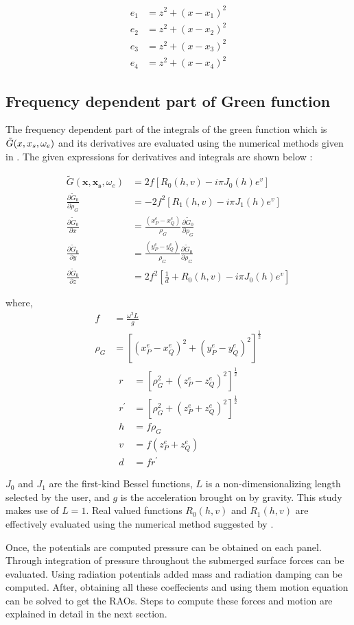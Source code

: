 \begin{align}
    e_1 &= z^2+(x-x_1)^2\\
    e_2 &= z^2+(x-x_2)^2\\
    e_3 &= z^2+(x-x_3)^2\\
    e_4 &= z^2+(x-x_4)^2
\end{align}

\subsection{Frequency dependent part of Green function}
The frequency dependent part of the integrals of the green function which is $\Tilde{G}(x, x_s, \omega_e)$ and its derivatives are 
evaluated using the numerical methods given in \cite{telste1986numerical}. The given expressions for derivatives and integrals are shown below : 

\begin{align}
    \tilde{G}(\boldsymbol{x},\boldsymbol{x_s}, \omega_e) &= 2f\left[ R_0(h,v) - i \pi J_0(h)e^{v}\right]\\
    \frac{\partial{\tilde{G}_0}}{\partial{\rho_G}} &= -2f^{2}\left[R_1(h,v)-i\pi J_{1}(h)e^v\right]\\
    \frac{\partial{\tilde{G}_0}}{\partial{x}} &=\frac{(x^e_P-x^e_Q)}{\rho_G}\frac{\partial{\tilde{G}_0}}{\partial{\rho_G}}\\
    \frac{\partial \tilde{G}_{0}}{\partial y} &= \frac{\left(y^e_P-y^e_Q\right)}{\rho_G} \frac{\partial \tilde{G}_{0}}{\partial \rho_G}\\
    \frac{\partial \tilde{G}_{0}}{\partial z} &= 2 f^{2}\left[\frac{1}{d}+R_{0}(h, v)-i \pi J_{0}(h) e^{v}\right]
\end{align}

where, 
\begin{align}
    f &= \frac{\omega^2 L}{g} \\
    \rho_G &= \left[(x^e_P-x^e_Q)^2 + (y^e_P-y^e_Q)^2\right]^{\frac{1}{2}}
\end{align}
\begin{align}
    r &= \left[\rho^2_G+(z^e_P-z^e_Q)^2\right]^{\frac{1}{2}} \\
    {r}^{\prime}&= \left[\rho^2_G+(z^e_P+z^e_Q)^2\right]^{\frac{1}{2}} \\
    h &= f\rho_G \\
    v &= f(z^e_P+z^e_Q) \\
    d &= f {r}^{\prime}
\end{align}

$J_0$ and $J_1$ are the first-kind Bessel functions, $L$ is a non-dimensionalizing length selected by the user, 
and $g$ is the acceleration brought on by gravity. This study makes use of $L=1$. Real valued functions $R_0(h,v)$ 
and $R_1(h,v)$ are effectively evaluated using the numerical method suggested by \cite{telste1986numerical}.

Once, the potentials are computed pressure can be obtained on each panel.
Through integration of pressure throughout the submerged surface forces can be evaluated. 
Using radiation potentials added mass and radiation damping can be computed. 
After, obtaining all these coeffecients and using them motion equation can be solved to get the RAOs.
Steps to compute these forces and motion are explained in detail in the next section.